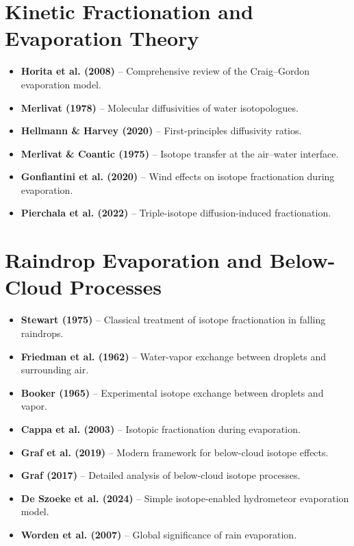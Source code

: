 \documentclass[11pt,a4paper]{article}
\begin{document}
\section{Kinetic Fractionation and Evaporation Theory}

\begin{itemize}
    \item \textbf{Horita et al. (2008)} -- Comprehensive review of the Craig--Gordon evaporation model.
    \item \textbf{Merlivat (1978)} -- Molecular diffusivities of water isotopologues.
    \item \textbf{Hellmann \& Harvey (2020)} -- First-principles diffusivity ratios.
    \item \textbf{Merlivat \& Coantic (1975)} -- Isotope transfer at the air--water interface.
    \item \textbf{Gonfiantini et al. (2020)} -- Wind effects on isotope fractionation during evaporation.
    \item \textbf{Pierchala et al. (2022)} -- Triple-isotope diffusion-induced fractionation.
\end{itemize}

\section{Raindrop Evaporation and Below-Cloud Processes}
\begin{itemize}
    \item \textbf{Stewart (1975)} -- Classical treatment of isotope fractionation in falling raindrops.
    \item \textbf{Friedman et al. (1962)} -- Water-vapor exchange between droplets and surrounding air.
    \item \textbf{Booker (1965)} -- Experimental isotope exchange between droplets and vapor.
    \item \textbf{Cappa et al. (2003)} -- Isotopic fractionation during evaporation.
    \item \textbf{Graf et al. (2019)} -- Modern framework for below-cloud isotope effects.
    \item \textbf{Graf (2017)} -- Detailed analysis of below-cloud isotope processes.
    \item \textbf{De Szoeke et al. (2024)} -- Simple isotope-enabled hydrometeor evaporation model.
    \item \textbf{Worden et al. (2007)} -- Global significance of rain evaporation.
\end{itemize}
\end{document}
